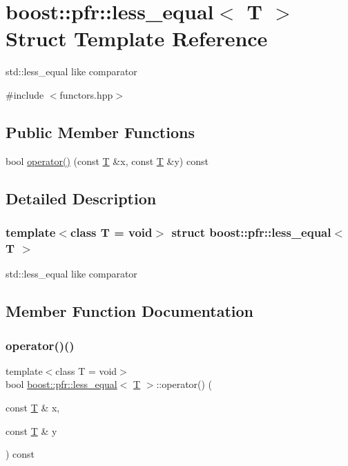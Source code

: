 \hypertarget{structboost_1_1pfr_1_1less__equal}{}\section{boost\+:\+:pfr\+:\+:less\+\_\+equal$<$ T $>$ Struct Template Reference}
\label{structboost_1_1pfr_1_1less__equal}


std\+::less\+\_\+equal like comparator  




{\ttfamily \#include $<$functors.\+hpp$>$}

\subsection*{Public Member Functions}
\begin{DoxyCompactItemize}
\item 
bool \mbox{\hyperlink{structboost_1_1pfr_1_1less__equal_a208da0c991b1904599cf73174bc86822}{operator()}} (const \mbox{\hyperlink{struct_t}{T}} \&x, const \mbox{\hyperlink{struct_t}{T}} \&y) const
\end{DoxyCompactItemize}


\subsection{Detailed Description}
\subsubsection*{template$<$class T = void$>$\newline
struct boost\+::pfr\+::less\+\_\+equal$<$ T $>$}

std\+::less\+\_\+equal like comparator 

\subsection{Member Function Documentation}
\mbox{\label{structboost_1_1pfr_1_1less__equal_a208da0c991b1904599cf73174bc86822}} 
\subsubsection{\texorpdfstring{operator()()}{operator()()}}
{\footnotesize\ttfamily template$<$class T  = void$>$ \\
bool \mbox{\hyperlink{structboost_1_1pfr_1_1less__equal}{boost\+::pfr\+::less\+\_\+equal}}$<$ \mbox{\hyperlink{struct_t}{T}} $>$\+::operator() (\begin{DoxyParamCaption}\item[{const \mbox{\hyperlink{struct_t}{T}} \&}]{x,  }\item[{const \mbox{\hyperlink{struct_t}{T}} \&}]{y }\end{DoxyParamCaption}) const\hspace{0.3cm}{\ttfamily [inline]}}

